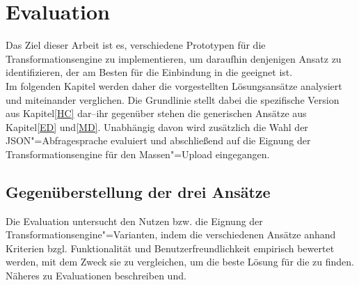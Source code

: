 
\chapter{Evaluation} \label{EV}


Das Ziel dieser Arbeit ist es, verschiedene Prototypen für die Transformationsengine zu implementieren, um daraufhin denjenigen Ansatz zu identifizieren, der am Besten für die Einbindung in die  geeignet ist.\\
Im folgenden Kapitel werden daher die vorgestellten Lösungsansätze analysiert und miteinander verglichen. Die Grundlinie stellt dabei die spezifische Version aus Kapitel\nbs\ref{HC} dar\nbs --\nbs ihr gegenüber stehen die generischen Ansätze aus Kapitel\nbs\ref{ED} und\nbs\ref{MD}. Unabhängig davon wird zusätzlich die Wahl der JSON"=Abfragesprache evaluiert und abschließend auf die Eignung der Transformationsengine für den Massen"=Upload eingegangen.


\section{Gegenüberstellung der drei Ansätze}\label{G3A}

Die Evaluation untersucht den Nutzen bzw. die Eignung der Transformationsengine"=Varianten, indem die verschiedenen Ansätze anhand Kriterien bzgl. Funktionalität und Benutzerfreundlichkeit empirisch bewertet werden, mit dem Zweck sie zu vergleichen, um die beste Lösung für die  zu finden. Näheres zu Evaluationen beschreiben\nbs\cite{eval:sta} und\nbs\cite{eval:meth}.

